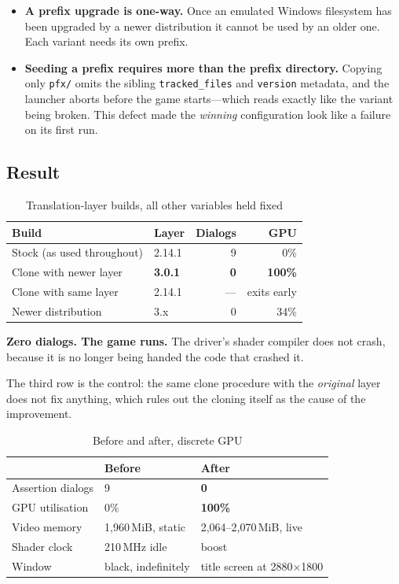 \begin{itemize}
\item \textbf{A prefix upgrade is one-way.} Once an emulated Windows filesystem
      has been upgraded by a newer distribution it cannot be used by an older
      one. Each variant needs its own prefix.
\item \textbf{Seeding a prefix requires more than the prefix directory.} Copying
      only \verb|pfx/| omits the sibling \verb|tracked_files| and \verb|version|
      metadata, and the launcher aborts before the game starts---which reads
      exactly like the variant being broken. This defect made the
      \emph{winning} configuration look like a failure on its first run.
\end{itemize}

\subsection{Result}

\begin{table}[htbp]
\caption{Translation-layer builds, all other variables held fixed}
\label{tab:proton}
\centering
\footnotesize
\begin{tabular}{@{}llrr@{}}
\toprule
\textbf{Build} & \textbf{Layer} & \textbf{Dialogs} & \textbf{GPU} \\
\midrule
Stock (as used throughout) & 2.14.1 & 9 & 0\% \\
Clone with newer layer & \textbf{3.0.1} & \textbf{0} & \textbf{100\%} \\
Clone with same layer & 2.14.1 & --- & exits early \\
Newer distribution & 3.x & 0 & 34\% \\
\bottomrule
\end{tabular}
\end{table}

\textbf{Zero dialogs. The game runs.} The driver's shader compiler does not
crash, because it is no longer being handed the code that crashed it.

The third row is the control: the same clone procedure with the \emph{original}
layer does not fix anything, which rules out the cloning itself as the cause of
the improvement.

\begin{table}[htbp]
\caption{Before and after, discrete GPU}
\label{tab:beforeafter}
\centering
\footnotesize
\begin{tabularx}{\columnwidth}{@{}L{3.0cm}XX@{}}
\toprule
& \textbf{Before} & \textbf{After} \\
\midrule
Assertion dialogs & 9 & \textbf{0} \\
GPU utilisation & 0\% & \textbf{100\%} \\
Video memory & 1{,}960\,MiB, static & 2{,}064--2{,}070\,MiB, live \\
Shader clock & 210\,MHz idle & boost \\
Window & black, indefinitely & title screen at 2880$\times$1800 \\
\bottomrule
\end{tabularx}
\end{table}

